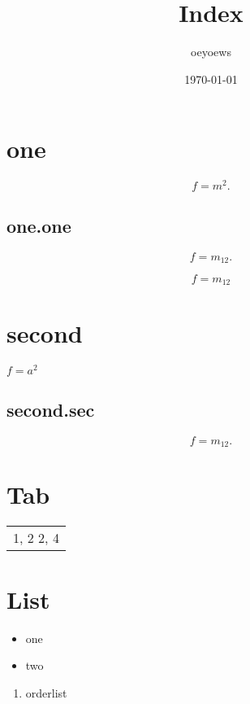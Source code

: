 \documentclass[12pt, a4paper, oneside]{article}
\title{Index}
\author{oeyoews}
\date{\today}
\begin{document}
\maketitle

\tableofcontents







\section{one}%

\[
f = m^2
.\]

\subsection{one.one}%
\label{sub:one.one}

\[
f = m_{12}
.\]

$$
f = m_{12}
$$

\section{second}%
\label{sec:second}

$f=a^2$

\subsection{second.sec}%
\label{sub:second.sec}

\[
f = m_{12}
.\]

\section{Tab}%
\label{sec:Tab}

\begin{tabular}{c}
  1, 2
  2, 4
\end{tabular}

\section{List}%
\label{sec:List}

\begin{itemize}
  \item one
  \item two
\end{itemize}

\begin{enumerate}
  \item orderlist
\end{enumerate}

\cite{Wille1982}
\end{document}
